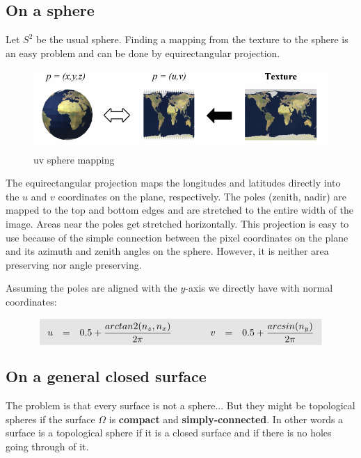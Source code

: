 \documentclass[11pt,a4paper]{article}
\renewcommand{\colbox}[1]{\colorbox{lightgray}{$ #1 $}}
\begin{document}
\subsection{On a sphere}

Let $S^2$ be the usual sphere. Finding a mapping from the texture to the sphere is an easy problem and can be done by equirectangular projection. 

\vskip 0.3cm
\begin{figure}[H]
   \centering
   \includegraphics[width=12cm]{2.png}
   \caption{uv sphere mapping}
\end{figure}
\vskip 0.3cm

The equirectangular projection maps the longitudes and latitudes directly into the $u$ and $v$ coordinates on the plane, respectively. The poles (zenith, nadir) are mapped to the top and bottom edges and are stretched to the entire width of the image. Areas near the poles get stretched horizontally. This projection is easy to use because of the simple connection between the pixel coordinates on the plane and its azimuth and zenith angles on the sphere. However, it is neither area preserving nor angle preserving.

\vskip 0.3cm
\noindent Assuming the poles are aligned with the $y$-axis we directly have with normal coordinates:

$$
\colbox{
\begin{array}{l c l c c c l c l}
    u & = & 0.5 + \dfrac{arctan2(n_z, n_x)}{2\pi} &
    &&&
    v & = & 0.5 + \dfrac{arcsin(n_y)}{2\pi}\\
\end{array}
}
$$

\subsection{On a general closed surface}

The problem is that every surface is not a sphere... But they might be topological spheres if the surface $\Omega$ is \textbf{compact} and \textbf{simply-connected}. In other words a surface is a topological sphere if it is a closed surface and if there is no holes going through of it.
\end{document}
